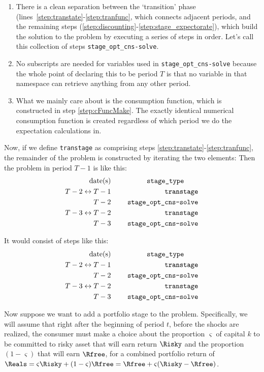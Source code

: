 \documentclass[\econtexRoot/BufferStockTheory]{subfiles}
\begin{document}
\begin{enumerate}
\item There is a clean separation between the `transition' phase (lines~\ref{step:transtate}-\ref{step:tranfunc}, which connects adjacent periods, and the remaining steps (\ref{step:discounting}-\ref{step:stage_expectorate}), which build the solution to the problem by executing a series of steps in order.
Let's call this collection of steps \texttt{stage\_opt\_cns-solve}.
\item No subscripts are needed for variables used in \texttt{stage\_opt\_cns-solve} because the whole point of declaring this to be period $T$ is that no variable in that namespace can retrieve anything from any other period.
  \item What we mainly care about is the consumption function, which is constructed in step \ref{step:cFuncMake}.
The exactly identical numerical consumption function is created regardless of which period we do the expectation calculations in.
  \end{enumerate}


  Now, if we define \texttt{transtage} as comprising steps \ref{step:transtate}-\ref{step:tranfunc}, the remainder of the problem is constructed by iterating the two elements:
Then the problem in period $T-1$ is like this:
\begin{alignat}{3}
\text{date(s)}              &      &   \notag       \qquad \texttt{stage\_type} \qquad
\\ T-2\leftrightarrow T-1 & ~~~~ & \text{\texttt{transtage}}
\\ T-2 & ~~~~ & \text{\texttt{stage\_opt\_cns-solve}}
\\ T-3\leftrightarrow T-2 & ~~~~ & \text{\texttt{transtage}}
\\ T-3 & ~~~~ & \text{\texttt{stage\_opt\_cns-solve}}
\end{alignat}

It would consist of steps like this:
\begin{alignat}{3}
\text{date(s)}              &      &   \notag       \qquad \texttt{stage\_type} \qquad
\\ T-2\leftrightarrow T-1 & ~~~~ & \text{\texttt{transtage}}
\\ T-2 & ~~~~ & \text{\texttt{stage\_opt\_cns-solve}}
\\ T-3\leftrightarrow T-2 & ~~~~ & \text{\texttt{transtage}}
\\ T-3 & ~~~~ & \text{\texttt{stage\_opt\_cns-solve}}
\end{alignat}

Now suppose we want to add a portfolio stage to the problem.
Specifically, we will assume that right after the beginning of period $t$, before the shocks are realized, the consumer must make a choice about the proportion $\varsigma$ of capital $k$ to be committed to risky asset that will earn return $\Risky$ and the proportion $(1-\varsigma)$ that will earn $\Rfree$, for a combined portfolio return of $\Reals=\varsigma \Risky + (1-\varsigma)\Rfree = \Rfree+\varsigma(\Risky-\Rfree)$.
\end{document}
